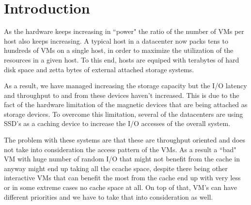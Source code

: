 
%
%

\section{Introduction}
As the hardware keeps increasing in ``power" the ratio of the number of VMs per host also keeps increasing. A typical host in a datacenter now packs tens to hundreds of VMs on a single host, in order to maximize the utilization of the resources in a given host. To this end, hosts are equiped with terabytes of hard disk space and zetta bytes of external attached storage systems.

As a result, we have managed increasing the storage capacity but the I/O latency and throughput to and from these devices haven't increased. This is due to the fact of the hardware limitation of the magnetic devices that are being attached as storage devices. To overcome this limitation, several of the datacenters are using SSD's as a caching device to increase the I/O accesses of the overall system.

The problem with these systems are that these are throughput oriented and does not take into consideration the access pattern of the VMs. As a result a ``bad" VM with huge number of random I/O that might not benefit from the cache in anyway might end up taking all the ccache space, despite there being other interactive VMs that can benefit the most from the cache end up with very less or in some extreme cases no cache space at all. On top of that, VM's can have different priorities and we have to take that into consideration as well.

